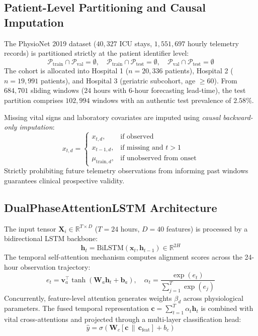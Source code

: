 \documentclass[10pt,a4paper,twocolumn,twoside]{article}
\begin{document}
\subsection{Patient-Level Partitioning and Causal Imputation}
The PhysioNet 2019 dataset ($40,327$ ICU stays, $1,551,697$ hourly telemetry records) is partitioned strictly at the patient identifier level:
\begin{equation}
\mathcal{P}_{\text{train}} \cap \mathcal{P}_{\text{val}} = \emptyset, \quad \mathcal{P}_{\text{train}} \cap \mathcal{P}_{\text{test}} = \emptyset, \quad \mathcal{P}_{\text{val}} \cap \mathcal{P}_{\text{test}} = \emptyset
\end{equation}
The cohort is allocated into Hospital 1 ($n=20,336$ patients), Hospital 2 ($n=19,991$ patients), and Hospital 3 (geriatric subcohort, age $\ge 60$). From $684,701$ sliding windows ($24$ hours with $6$-hour forecasting lead-time), the test partition comprises $102,994$ windows with an authentic test prevalence of $2.58\%$.

Missing vital signs and laboratory covariates are imputed using \textit{causal backward-only imputation}:
\begin{equation}
x_{t, d} = 
\begin{cases} 
x_{t, d}, & \text{if observed} \\
x_{t-1, d}, & \text{if missing and } t > 1 \\
\mu_{\text{train}, d}, & \text{if unobserved from onset}
\end{cases}
\end{equation}
Strictly prohibiting future telemetry observations from informing past windows guarantees clinical prospective validity.

\subsection{DualPhaseAttentionLSTM Architecture}
The input tensor $\mathbf{X}_i \in \mathbb{R}^{T \times D}$ ($T=24$ hours, $D=40$ features) is processed by a bidirectional LSTM backbone:
\begin{equation}
\mathbf{h}_t = \text{BiLSTM}(\mathbf{x}_t, \mathbf{h}_{t-1}) \in \mathbb{R}^{2H}
\end{equation}
The temporal self-attention mechanism computes alignment scores across the 24-hour observation trajectory:
\begin{equation}
e_t = \mathbf{v}_a^\top \tanh(\mathbf{W}_a \mathbf{h}_t + \mathbf{b}_a), \quad \alpha_t = \frac{\exp(e_t)}{\sum_{j=1}^T \exp(e_j)}
\end{equation}
Concurrently, feature-level attention generates weights $\beta_d$ across physiological parameters. The fused temporal representation $\mathbf{c} = \sum_{t=1}^T \alpha_t \mathbf{h}_t$ is combined with vital cross-attentions and projected through a multi-layer classification head:
\begin{equation}
\hat{y} = \sigma(\mathbf{W}_c [\mathbf{c} \,\|\, \mathbf{c}_{\text{feat}}] + b_c)
\end{equation}
\end{document}
